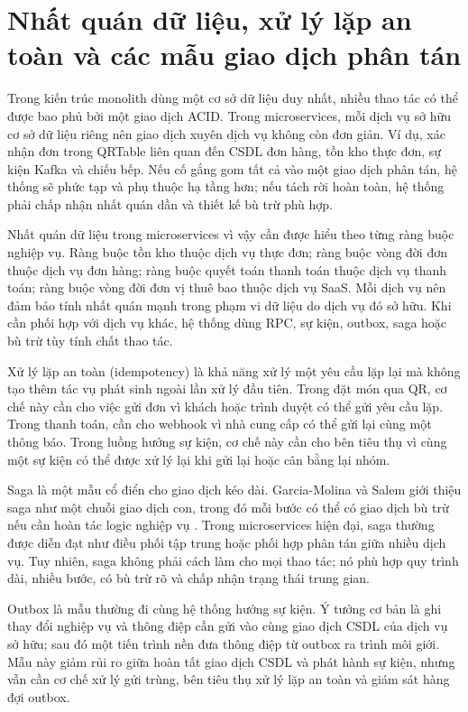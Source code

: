 \section{Nhất quán dữ liệu, xử lý lặp an toàn và các mẫu giao dịch phân tán}

Trong kiến trúc monolith dùng một cơ sở dữ liệu duy nhất, nhiều thao tác có thể được bao phủ bởi một giao dịch ACID. Trong microservices, mỗi dịch vụ sở hữu cơ sở dữ liệu riêng nên giao dịch xuyên dịch vụ không còn đơn giản. Ví dụ, xác nhận đơn trong QRTable liên quan đến CSDL đơn hàng, tồn kho thực đơn, sự kiện Kafka và chiếu bếp. Nếu cố gắng gom tất cả vào một giao dịch phân tán, hệ thống sẽ phức tạp và phụ thuộc hạ tầng hơn; nếu tách rời hoàn toàn, hệ thống phải chấp nhận nhất quán dần và thiết kế bù trừ phù hợp.

Nhất quán dữ liệu trong microservices vì vậy cần được hiểu theo từng ràng buộc nghiệp vụ. Ràng buộc tồn kho thuộc dịch vụ thực đơn; ràng buộc vòng đời đơn thuộc dịch vụ đơn hàng; ràng buộc quyết toán thanh toán thuộc dịch vụ thanh toán; ràng buộc vòng đời đơn vị thuê bao thuộc dịch vụ SaaS. Mỗi dịch vụ nên đảm bảo tính nhất quán mạnh trong phạm vi dữ liệu do dịch vụ đó sở hữu. Khi cần phối hợp với dịch vụ khác, hệ thống dùng RPC, sự kiện, outbox, saga hoặc bù trừ tùy tính chất thao tác.

Xử lý lặp an toàn (idempotency) là khả năng xử lý một yêu cầu lặp lại mà không tạo thêm tác vụ phát sinh ngoài lần xử lý đầu tiên. Trong đặt món qua QR, cơ chế này cần cho việc gửi đơn vì khách hoặc trình duyệt có thể gửi yêu cầu lặp. Trong thanh toán, cần cho webhook vì nhà cung cấp có thể gửi lại cùng một thông báo. Trong luồng hướng sự kiện, cơ chế này cần cho bên tiêu thụ vì cùng một sự kiện có thể được xử lý lại khi gửi lại hoặc cân bằng lại nhóm.

Saga là một mẫu cổ điển cho giao dịch kéo dài. Garcia-Molina và Salem giới thiệu saga như một chuỗi giao dịch con, trong đó mỗi bước có thể có giao dịch bù trừ nếu cần hoàn tác logic nghiệp vụ \cite{garcia-molina-sagas-1987}. Trong microservices hiện đại, saga thường được diễn đạt như điều phối tập trung hoặc phối hợp phân tán giữa nhiều dịch vụ. Tuy nhiên, saga không phải cách làm cho mọi thao tác; nó phù hợp quy trình dài, nhiều bước, có bù trừ rõ và chấp nhận trạng thái trung gian.

Outbox là mẫu thường đi cùng hệ thống hướng sự kiện. Ý tưởng cơ bản là ghi thay đổi nghiệp vụ và thông điệp cần gửi vào cùng giao dịch CSDL của dịch vụ sở hữu; sau đó một tiến trình nền đưa thông điệp từ outbox ra trình môi giới. Mẫu này giảm rủi ro giữa hoàn tất giao dịch CSDL và phát hành sự kiện, nhưng vẫn cần cơ chế xử lý gửi trùng, bên tiêu thụ xử lý lặp an toàn và giám sát hàng đợi outbox.


